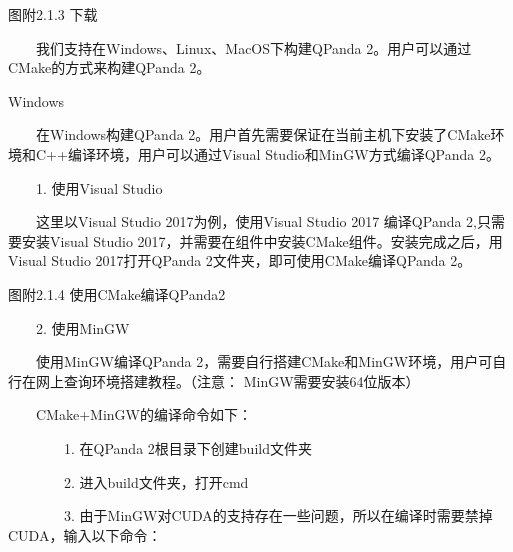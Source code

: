 \documentclass[a4paper,11pt,english]{sphinxmanual}
\begin{document}

\begin{center}图附2.1.3 下载
\end{center}
\sphinxAtStartPar
{}

\sphinxAtStartPar
​  我们支持在Windows、Linux、MacOS下构建QPanda 2。用户可以通过CMake的方式来构建QPanda 2。

\sphinxAtStartPar
Windows

\sphinxAtStartPar
​  在Windows构建QPanda 2。用户首先需要保证在当前主机下安装了CMake环境和C++编译环境，用户可以通过Visual Studio和MinGW方式编译QPanda 2。

\sphinxAtStartPar
  1. 使用Visual Studio

\sphinxAtStartPar
​  这里以Visual Studio 2017为例，使用Visual Studio 2017 编译QPanda 2,只需要安装Visual Studio 2017，并需要在组件中安装CMake组件。安装完成之后，用Visual Studio 2017打开QPanda 2文件夹，即可使用CMake编译QPanda 2。


\begin{center}图附2.1.4 使用CMake编译QPanda2
\end{center}
\sphinxAtStartPar
  2. 使用MinGW

\sphinxAtStartPar
​  使用MinGW编译QPanda 2，需要自行搭建CMake和MinGW环境，用户可自行在网上查询环境搭建教程。（注意： MinGW需要安装64位版本）

\sphinxAtStartPar
​  CMake+MinGW的编译命令如下：

\sphinxAtStartPar
    1. 在QPanda 2根目录下创建build文件夹

\sphinxAtStartPar
    2. 进入build文件夹，打开cmd

\sphinxAtStartPar
    3. 由于MinGW对CUDA的支持存在一些问题，所以在编译时需要禁掉CUDA，输入以下命令：

\begin{sphinxVerbatim}[commandchars=\\\{\}]
    
\end{sphinxVerbatim}
\end{document}
